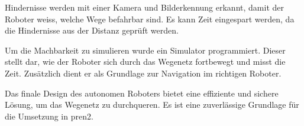 Hindernisse werden mit einer Kamera und Bilderkennung erkannt, damit der Roboter weiss, welche Wege befahrbar sind. Es kann Zeit eingespart werden, da die Hindernisse aus der Distanz geprüft werden.

Um die Machbarkeit zu simulieren wurde ein Simulator programmiert. Dieser stellt dar, wie der Roboter sich durch das Wegenetz fortbewegt und misst die Zeit. Zusätzlich dient er als Grundlage zur Navigation im richtigen Roboter.

Das finale Design des autonomen Roboters bietet eine effiziente und sichere Lösung, um das Wegenetz zu durchqueren. Es ist eine zuverlässige Grundlage für die Umsetzung in \acrfull{pren2}.



